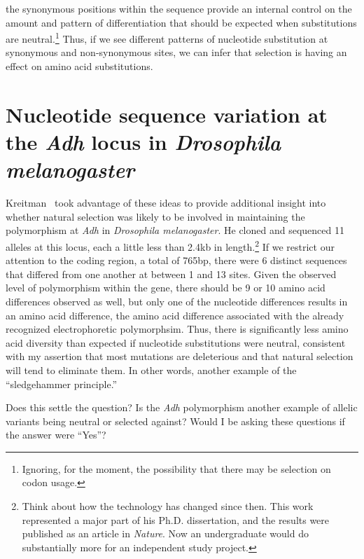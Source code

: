 \documentclass[12pt]{article}
\begin{document}
\noindent the synonymous positions within the sequence provide an
internal control on the amount and pattern of differentiation that
should be expected when substitutions are neutral.\footnote{Ignoring,
  for the moment, the possibility that there may be selection on codon
  usage.}  Thus, if we see different patterns of nucleotide
substitution at synonymous and non-synonymous sites, we can infer that
selection is having an effect on amino acid substitutions.

\section*{Nucleotide sequence variation at the {\it Adh\/} locus in
  {\it Drosophila melanogaster}}

Kreitman~\cite{Kreitman83} took advantage of these ideas to provide
additional insight into whether natural selection was likely to be
involved in maintaining the polymorphism at {\it Adh\/} in {\it
  Drosophila melanogaster}. He cloned and sequenced 11 alleles at this
locus, each a little less than 2.4kb in length.\footnote{Think about
  how the technology has changed since then. This work represented a
  major part of his Ph.D. dissertation, and the results were published
  as an article in {\it Nature}. Now an undergraduate would do
  substantially more for an independent study project.} If we restrict
our attention to the coding region, a total of 765bp, there were 6
distinct sequences that differed from one another at between 1 and 13
sites. Given the observed level of polymorphism within the gene, there
should be 9 or 10 amino acid differences observed as well, but only
one of the nucleotide differences results in an amino acid difference,
the amino acid difference associated with the already recognized
electrophoretic polymorphsim. Thus, there is significantly less amino
acid diversity than expected if nucleotide substitutions were neutral,
consistent with my assertion that most mutations are deleterious and
that natural selection will tend to eliminate
them. In other words, another example
of the ``sledgehammer principle.''

Does this settle the question? Is the {\it Adh\/} polymorphism another
example of allelic variants being neutral or selected against? Would I
be asking these questions if the answer were ``Yes''?
\end{document}
